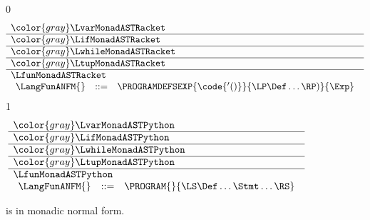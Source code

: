 \documentclass[7x10]{TimesAPriori_MIT}%
\newcommand{\gray}[1]{{\color{gray} #1}}
\def\racketEd{0}
\def\pythonEd{1}
\def\edition{1}
\newcommand{\pythonColor}[0]{}
\numberwithin{theorem}{chapter}
\numberwithin{definition}{chapter}
\numberwithin{equation}{chapter}
\begin{document}
\begin{figure}[tp]
\centering
\begin{tcolorbox}[colback=white]
\footnotesize
{\if\edition\racketEd    
\[
\begin{array}{l}
  \gray{\LvarMonadASTRacket} \\ \hline
  \gray{\LifMonadASTRacket} \\ \hline
  \gray{\LwhileMonadASTRacket} \\ \hline
  \gray{\LtupMonadASTRacket} \\ \hline
  \LfunMonadASTRacket \\
\begin{array}{rcl}
\LangFunANFM{}  &::=& \PROGRAMDEFSEXP{\code{'()}}{\LP\Def\ldots\RP)}{\Exp}
\end{array}
\end{array}
\]
\fi}
{\if\edition\pythonEd\pythonColor
\[
\begin{array}{l}
  \gray{\LvarMonadASTPython} \\ \hline
  \gray{\LifMonadASTPython} \\ \hline
  \gray{\LwhileMonadASTPython} \\ \hline
  \gray{\LtupMonadASTPython} \\ \hline
  \LfunMonadASTPython \\
  \begin{array}{rcl}
     \LangFunANFM{} &::=& \PROGRAM{}{\LS \Def \ldots \Stmt \ldots \RS}
  \end{array}
\end{array}
\]
\fi}
\end{tcolorbox}

\caption{\LangFunANF{} is \LangFunRef{} in monadic normal form.}
\label{fig:Lfun-anf-syntax}
\end{figure}



\end{document}
